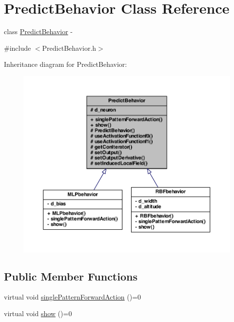 \hypertarget{class_predict_behavior}{
\section{PredictBehavior Class Reference}
\label{class_predict_behavior}
}


class \hyperlink{class_predict_behavior}{PredictBehavior} -\/  




{\ttfamily \#include $<$PredictBehavior.h$>$}



Inheritance diagram for PredictBehavior:\nopagebreak
\begin{figure}[H]
\begin{center}
\leavevmode
\includegraphics[width=400pt]{class_predict_behavior__inherit__graph}
\end{center}
\end{figure}
\subsection*{Public Member Functions}
\begin{DoxyCompactItemize}
\item 
virtual void \hyperlink{class_predict_behavior_a13d82e6ee45b4fa1b7e17941f990fdc5}{singlePatternForwardAction} ()=0
\item 
virtual void \hyperlink{class_predict_behavior_a9ef84360f73784248d994fa4707c1dde}{show} ()=0
\end{DoxyCompactItemize}
